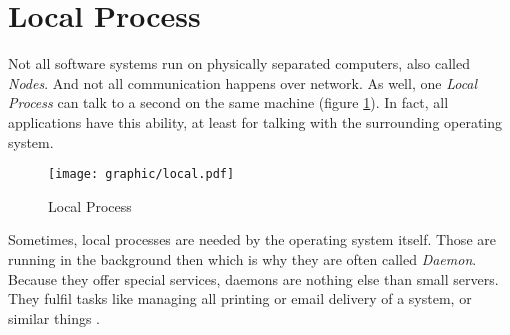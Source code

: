 %
%
%
%
%
%
%

\section{Local Process}
\label{local_process_heading}

Not all software systems run on physically separated computers, also called
\emph{Nodes}. And not all communication happens over network. As well, one
\emph{Local Process} can talk to a second on the same machine (figure
\ref{local_figure}). In fact, all applications have this ability, at least for
talking with the surrounding operating system.

\begin{figure}[ht]
    \begin{center}
        \texttt{[image: graphic/local.pdf]}
        \caption{Local Process}
        \label{local_figure}
    \end{center}
\end{figure}

Sometimes, local processes are needed by the operating system itself. Those are
running in the background then which is why they are often called \emph{Daemon}.
Because they offer special services, daemons are nothing else than small
servers. They fulfil tasks like managing all printing or email delivery of a
system, or similar things \cite[p. 74]{tanenbaum2001}.

